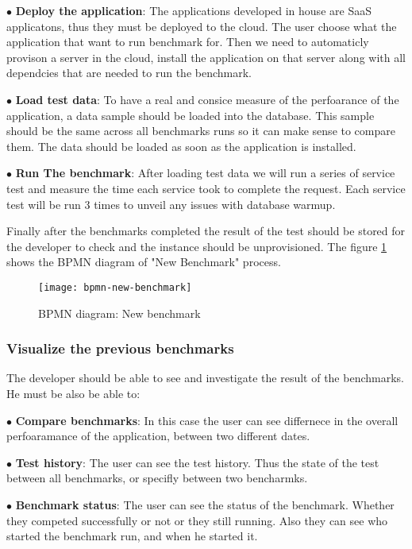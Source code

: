 $\bullet$ \textbf{Deploy the application}: The applications developed in house
are SaaS applicatons, thus they must be deployed to the cloud. The user choose
what the application that want to run benchmark for. Then we need to automaticly
provison a server in the cloud, install the application on that server along
with all dependcies that are needed to run the benchmark.

$\bullet$ \textbf{Load test data}: To have a real and consice measure of the
perfoarance of the application, a data sample should be loaded into the
database. This sample should be the same across all benchmarks runs so it can
make sense to compare them. The data should be loaded as soon as the application
is installed.

$\bullet$ \textbf{Run The benchmark}: After loading test data we will run a
series of service test and measure the time each service took to complete the
request. Each service test will be run 3 times to unveil any issues with
database warmup.

Finally after the benchmarks completed the result of the test should be stored
for the developer to check and the instance should be unprovisioned. The figure
\hyperref[fig:bpmn-new-benchmark]{\ref{fig:bpmn-new-benchmark}} shows the BPMN diagram
of "New Benchmark" process.

\begin{figure}[h]
  \texttt{[image: bpmn-new-benchmark]}
\caption{BPMN diagram: New benchmark}
\label{fig:bpmn-new-benchmark}
\end{figure}

\subsubsection{Visualize the previous benchmarks}
The developer should be able to see and investigate the result of the
benchmarks. He must be also be able to:

$\bullet$ \textbf{Compare benchmarks}: In this case the user can see differnece
in the overall perfoaramance of the application, between two different dates.

$\bullet$ \textbf{Test history}: The user can see the test history. Thus the
state of the test between all benchmarks, or specifly between two bencharmks.

$\bullet$ \textbf{Benchmark status}: The user can see the status of the
benchmark. Whether they competed successfully or not or they still running. Also
they can see who started the benchmark run, and when he started it.

